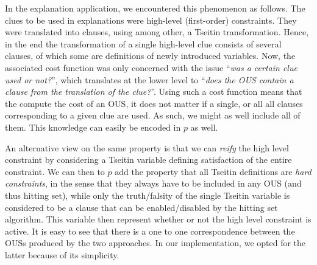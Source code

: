 In the explanation application, we encountered this phenomenon as follows. 
The clues to be used in explanations were high-level (first-order) constraints. They were translated into clauses, using among other, a Tseitin transformation.
Hence, in the end the transformation of a single high-level clue consists of several clauses, of which some are definitions of newly introduced variables. 
Now, the associated cost function was only concerned with the issue ``\emph{was a certain clue used or not?}'', which translates at the lower level to ``\emph{does the OUS contain a clause from the translation of the clue?}''.
Using such a cost function means that the compute the cost of an OUS, it does not matter if a single, or all all clauses corresponding to a given clue are used. As such, we might as well include all of them. This knowledge can easily be encoded in $p$ as well. 

An alternative view on the same property is that we can \emph{reify} the high level constraint by considering a Tseitin variable defining satisfaction of the entire constraint. 
We can then to $p$ add the property that all Tseitin definitions are \emph{hard constraints}, in the sense that they always have to be included in any OUS (and thus hitting set), while only the truth/falsity of the single Tseitin variable is considered to be a clause that can be enabled/disabled by the hitting set algorithm. 
This variable then represent whether or not the high level constraint is active.
It is easy to see that there is a one to one correspondence between the OUSs produced by the two approaches. In our implementation, we opted for the latter because of its simplicity. 


 
